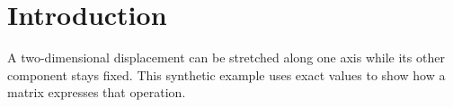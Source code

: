 \section{Introduction}
A two-dimensional displacement can be stretched along one axis while its
other component stays fixed. This synthetic example uses exact values to
show how a matrix expresses that operation.
